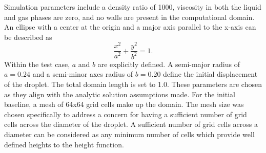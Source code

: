 Simulation parameters include a density ratio of 1000, viscosity in both the liquid and gas phases are zero, and no walls are present in the computational domain. An ellipse with a center at the origin and a major axis parallel to the x-axis can be described as 
\begin{equation}
\frac{x^2}{a^2} + \frac{y^2}{b^2} =1.
\end{equation}  
Within the test case, $a$ and $b$ are explicitly defined. A semi-major radius of $a=0.24$ and a semi-minor axes radius of $b=0.20$ define the initial displacement of the droplet. The total domain length is set to 1.0. These parameters are chosen as they align with the analytic solution assumptions made. For the initial baseline, a mesh of 64x64 grid cells make up the domain. The mesh size was chosen specifically to address a concern for having a sufficient number of grid cells across the diameter of the droplet. A sufficient number of grid cells across a diameter can be considered as any minimum number of cells which provide well defined heights to the height function.

